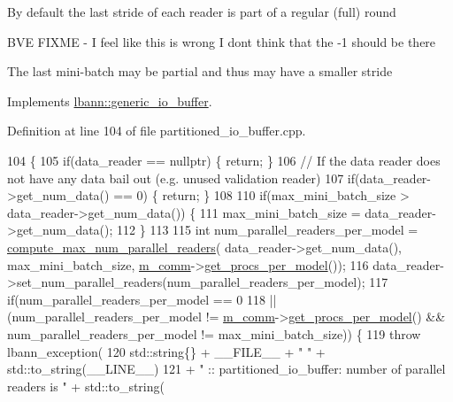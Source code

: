 By default the last stride of each reader is part of a regular (full) round

B\+VE F\+I\+X\+ME -\/ I feel like this is wrong I don\textquotesingle{}t think that the -\/1 should be there

The last mini-\/batch may be partial and thus may have a smaller stride 

Implements \hyperlink{classlbann_1_1generic__io__buffer_ac943184cf364f7922648e3acb760b41e}{lbann\+::generic\+\_\+io\+\_\+buffer}.



Definition at line 104 of file partitioned\+\_\+io\+\_\+buffer.\+cpp.


\begin{DoxyCode}
104                                                                                                            
                                        \{
105   \textcolor{keywordflow}{if}(data\_reader == \textcolor{keyword}{nullptr}) \{ \textcolor{keywordflow}{return}; \}
106   \textcolor{comment}{// If the data reader does not have any data bail out (e.g. unused validation reader)}
107   \textcolor{keywordflow}{if}(data\_reader->get\_num\_data() == 0) \{ \textcolor{keywordflow}{return}; \}
108 
110   \textcolor{keywordflow}{if}(max\_mini\_batch\_size > data\_reader->get\_num\_data()) \{
111     max\_mini\_batch\_size = data\_reader->get\_num\_data();
112   \}
113 
115   \textcolor{keywordtype}{int} num\_parallel\_readers\_per\_model = \hyperlink{classlbann_1_1partitioned__io__buffer_a5048100fb7cdc13908ecba6b4415b977}{compute\_max\_num\_parallel\_readers}(
      data\_reader->get\_num\_data(), max\_mini\_batch\_size, \hyperlink{classlbann_1_1generic__io__buffer_a2e4a46c85c8b30e10b1cc5acaa2c4cca}{m\_comm}->\hyperlink{classlbann_1_1lbann__comm_a5755dfdfc6377b4cae5ef8f7819e17de}{get\_procs\_per\_model}());
116   data\_reader->set\_num\_parallel\_readers(num\_parallel\_readers\_per\_model);
117   \textcolor{keywordflow}{if}(num\_parallel\_readers\_per\_model == 0
118      || (num\_parallel\_readers\_per\_model != \hyperlink{classlbann_1_1generic__io__buffer_a2e4a46c85c8b30e10b1cc5acaa2c4cca}{m\_comm}->\hyperlink{classlbann_1_1lbann__comm_a5755dfdfc6377b4cae5ef8f7819e17de}{get\_procs\_per\_model}() && 
      num\_parallel\_readers\_per\_model != max\_mini\_batch\_size)) \{
119     \textcolor{keywordflow}{throw} lbann\_exception(
120       std::string\{\} + \_\_FILE\_\_ + \textcolor{stringliteral}{" "} + std::to\_string(\_\_LINE\_\_)
121       + \textcolor{stringliteral}{" :: partitioned\_io\_buffer: number of parallel readers is "} + std::to\_string(

\end{DoxyCode}
